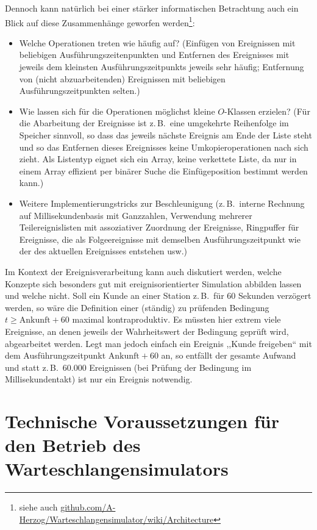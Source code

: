 \documentclass[deutsch]{svmono}
\begin{document}
Dennoch kann natürlich bei einer stärker informatischen Betrachtung auch ein Blick auf diese Zusammenhänge geworfen werden\footnote{siehe auch \href{https://github.com/A-Herzog/Warteschlangensimulator/wiki/Architecture}{github.com/A-Herzog/Warteschlangensimulator/wiki/Architecture}}:
\begin{itemize}
\item
Welche Operationen treten wie häufig auf? (Einfügen von Ereignissen mit beliebigen Ausführungszeitenpunkten und Entfernen des Ereignisses mit jeweils dem kleinsten Ausführungszeitpunkts jeweils sehr häufig; Entfernung von (nicht abzuarbeitenden) Ereignissen mit beliebigen Ausführungszeitpunkten selten.)
\item
Wie lassen sich für die Operationen möglichst kleine $O$-Klassen erzielen? (Für die Abarbeitung der Ereignisse ist z.\,B.\ eine umgekehrte Reihenfolge im Speicher sinnvoll, so dass das jeweils nächste Ereignis am Ende der Liste steht und so das Entfernen dieses Ereignisses keine Umkopieroperationen nach sich zieht. Als Listentyp eignet sich ein Array, keine verkettete Liste, da nur in einem Array effizient per binärer Suche die Einfügeposition bestimmt werden kann.)
\item
Weitere Implementierungstricks zur Beschleunigung (z.\,B.\ interne Rechnung auf Millisekundenbasis mit Ganzzahlen, Verwendung mehrerer Teilereignislisten mit assoziativer Zuordnung der Ereignisse, Ringpuffer für Ereignisse, die als Folgeereignisse mit demselben Ausführungszeitpunkt wie der des aktuellen Ereignisses entstehen usw.)
\end{itemize}

Im Kontext der Ereignisverarbeitung kann auch diskutiert werden, welche Konzepte sich besonders gut mit ereignisorientierter Simulation abbilden lassen und welche nicht. Soll ein Kunde an einer Station z.\,B.\ für 60 Sekunden verzögert werden, so wäre die Definition einer (ständig) zu prüfenden Bedingung $t\ge\textrm{Ankunft}+60$ maximal kontraproduktiv. Es müssten hier extrem viele Ereignisse, an denen jeweils der Wahrheitswert der Bedingung geprüft wird, abgearbeitet werden. Legt man jedoch einfach ein Ereignis ,,Kunde freigeben`` mit dem Ausführungszeitpunkt $\textrm{Ankunft}+60$ an, so entfällt der gesamte Aufwand und statt z.\,B.\ 60.000 Ereignissen (bei Prüfung der Bedingung im Millisekundentakt) ist nur ein Ereignis notwendig.



\section{Technische Voraussetzungen für den Betrieb des Warteschlangensimulators}
\end{document}
